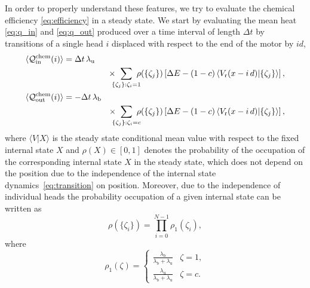\documentclass[aps,pre,twocolumn,showpacs,showkeys,superscriptaddress,floatfix]{revtex4-1}
\begin{document}
In order to properly understand these features, 
we try to evaluate the chemical efficiency \eqref{eq:efficiency} in a steady state. 
We start by evaluating the mean heat \eqref{eq:q_in} and \eqref{eq:q_out} produced over a time interval of length $\Delta t$ 
by transitions of a single head $i$ displaced with respect to the end of the motor by $i d$,  
\begin{gather*}
\begin{multlined}[b][.9\linewidth]
\langle \mathcal Q^\text{chem}_\text{in}(i) \rangle 
= \Delta t \, \lambda_\text{u} 
\\ \times 
\!\!\!\! \sum\limits_{\{\zeta_j\} : \zeta_i = 1 } \!\!\!\! \rho(\{ \zeta_j \} ) 
\left[ \Delta E - (1-c) \left\langle V_\text{r}(x - i \, d ) \middle| \{ \zeta_j \} \right\rangle \right] , 
\end{multlined}
\\
\begin{multlined}[b][.9\linewidth]
\langle \mathcal Q^\text{chem}_\text{out}(i) \rangle 
= - \Delta t \, \lambda_\text{b} 
\\ \times 
\!\!\!\! \sum\limits_{\{\zeta_j\} : \zeta_i = c } \!\!\!\! \rho(\{ \zeta_j \} ) 
\left[ \Delta E - (1-c) \left\langle V_\text{r}(x - i \, d ) \middle| \{ \zeta_j \} \right\rangle \right] , 
\end{multlined}
\end{gather*}
where $\langle V | X \rangle$ is the steady state conditional mean value with respect to the fixed internal state $X$ 
and $\rho(X) \in [0,1]$ denotes the probability of the occupation of the corresponding internal state $X$ in the steady state, 
which does not depend on the position due to the independence of the internal state dynamics~\eqref{eq:transition} on position. 
Moreover, due to the independence of individual heads the probability occupation of a given internal state can be written as 
\[
\rho( \{ \zeta_i \} ) = \prod_{i=0}^{N-1} \rho_1( \zeta_i ), 
\]  
where 
\[
\rho_1(\zeta) = \begin{cases} 
\frac{ \lambda_\text{b} }{ \lambda_\text{b} + \lambda_\text{u} } & \zeta = 1 , \\
\frac{ \lambda_\text{u} }{ \lambda_\text{b} + \lambda_\text{u} } & \zeta = c . 
\end{cases} 
\]
\end{document}
